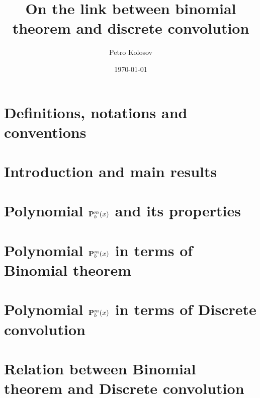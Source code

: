 \documentclass[12pt,letterpaper,oneside,reqno]{amsart}
\title[On the link between binomial theorem and discrete convolution]
{On the link between binomial theorem and discrete convolution}
\author[Petro Kolosov]{Petro Kolosov}
\date{\today}
\newcommand \polynomialP [4][P]{{\mathbf{#1}}\sp{#2} \sb{#3}(#4)}
\numberwithin{equation}{section}
\begin{document}
    \begin{abstract}
        
    \end{abstract}
    \maketitle
    \tableofcontents


    \section{Definitions, notations and conventions} \label{sec:definitions-notations-and-conventions}
    
    \clearpage


    \section{Introduction and main results} \label{sec:introduction}
    


    \section{Polynomial \texorpdfstring{$\polynomialP{m}{b}{x}$}{P[m,b,x]} and its properties}
    \label{sec:polynomial-p-and-its-properties}
    


    \section{Polynomial \texorpdfstring{$\polynomialP{m}{b}{x}$}{P[m,b,x]} in terms of Binomial theorem}
    \label{sec:odd-binomial-expansion-as-partial-case-of-polynomial-p}
    


    \section{Polynomial \texorpdfstring{$\polynomialP{m}{b}{x}$}{P[m,b,x]} in terms of Discrete convolution}
    \label{sec:relation-between-p-and-convolution-of-polynomials}
    


    \section{Relation between Binomial theorem and Discrete convolution}
    \label{sec:relation-between-binomial-theorem-and-discrete-convolution}
    
\end{document}
